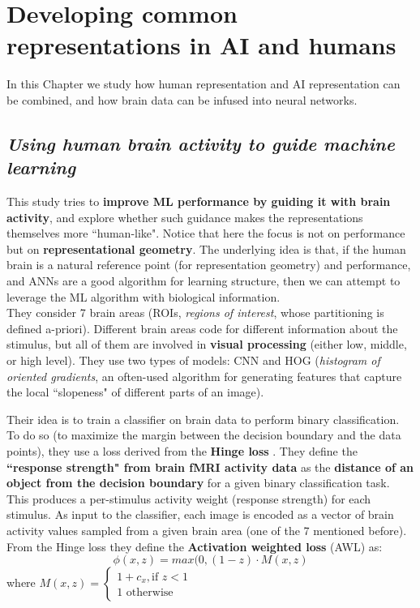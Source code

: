 \chapter{Developing common representations in AI and humans}
\label{chap:common_representations}

In this Chapter we study how human representation and AI representation can be combined, and how brain data can be infused into neural networks.

\section[Using human brain activity to guide machine learning]{\textit{Using human brain activity to guide machine learning}\\ }

This study tries to \textbf{improve ML performance by guiding it with brain activity}, and explore whether such guidance makes the representations themselves more ``human-like". Notice that here the focus is not on performance but on \textbf{representational geometry}. The underlying idea is that, if the human brain is a natural reference point (for representation geometry) and performance, and ANNs are a good algorithm for learning structure, then we can attempt to leverage the ML algorithm with biological information.\\

They consider 7 brain areas (ROIs, \textit{regions of interest}, whose partitioning is defined a-priori). Different brain areas code for different information about the stimulus, but all of them are involved in \textbf{visual processing} (either low, middle, or high level). They use two types of models: CNN and HOG (\textit{histogram of oriented gradients}, an often-used algorithm for generating features that capture the local ``slopeness" of different parts of an image).

Their idea is to train a classifier on brain data to perform binary classification. To do so (to maximize the margin between the decision boundary and the data points), they use a loss derived from the \textbf{Hinge loss} \notet. They define the \textbf{``response strength" from brain fMRI activity data} as the \textbf{distance of an object from the decision boundary} for a given binary classification task.
This produces a per-stimulus activity weight (response strength) for each stimulus. As input to the classifier, each image is encoded as a vector of brain activity values sampled from a given brain area (one of the 7 mentioned before).
From the Hinge loss they define the \textbf{Activation weighted loss} (AWL) as:
\[
\phi (x, z) = max(0, (1-z) \cdot M(x,z)
\]
where $M(x,z) =\begin{cases}
         1+c_x, \text{if } z<1\\
        1 \text{ otherwise}
        \end{cases}$


